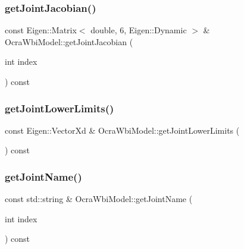 \hypertarget{classocra__icub_1_1OcraWbiModel_a80a97ad74f71529119c6417935ecbde1}{}\label{classocra__icub_1_1OcraWbiModel_a80a97ad74f71529119c6417935ecbde1} 
\subsubsection{\texorpdfstring{get\+Joint\+Jacobian()}{getJointJacobian()}}
{\footnotesize\ttfamily const Eigen\+::\+Matrix$<$ double, 6, Eigen\+::\+Dynamic $>$ \& Ocra\+Wbi\+Model\+::get\+Joint\+Jacobian (\begin{DoxyParamCaption}\item[{int}]{index }\end{DoxyParamCaption}) const\hspace{0.3cm}{\ttfamily [virtual]}}

\hypertarget{classocra__icub_1_1OcraWbiModel_a16eeeaeb928f3fa1f84273f8081453eb}{}\label{classocra__icub_1_1OcraWbiModel_a16eeeaeb928f3fa1f84273f8081453eb} 
\subsubsection{\texorpdfstring{get\+Joint\+Lower\+Limits()}{getJointLowerLimits()}}
{\footnotesize\ttfamily const Eigen\+::\+Vector\+Xd \& Ocra\+Wbi\+Model\+::get\+Joint\+Lower\+Limits (\begin{DoxyParamCaption}{ }\end{DoxyParamCaption}) const\hspace{0.3cm}{\ttfamily [virtual]}}

\hypertarget{classocra__icub_1_1OcraWbiModel_a9c5ca5123a2582bb43785db6d61413ea}{}\label{classocra__icub_1_1OcraWbiModel_a9c5ca5123a2582bb43785db6d61413ea} 
\subsubsection{\texorpdfstring{get\+Joint\+Name()}{getJointName()}}
{\footnotesize\ttfamily const std\+::string \& Ocra\+Wbi\+Model\+::get\+Joint\+Name (\begin{DoxyParamCaption}\item[{int}]{index }\end{DoxyParamCaption}) const\hspace{0.3cm}{\ttfamily [virtual]}}

